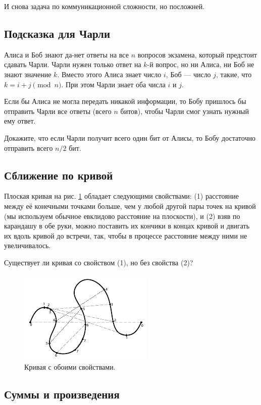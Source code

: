 \medskip

И снова задача по коммуникационной сложности, но посложней.

\subsection*{Подсказка для Чарли}

Алиса и Боб знают да-нет ответы на все $n$ вопросов экзамена, который предстоит сдавать Чарли.
Чарли нужен только ответ на $k$-й вопрос, но ни Алиса, ни Боб не знают значение $k$.
Вместо этого Алиса знает число $i$, Боб --- число $j$, такие, что $k = i + j \pmod n$.
При этом Чарли знает оба числа $i$ и $j$.

Если бы Алиса не могла передать никакой информации,
то Бобу пришлось бы отправить Чарли все ответы (всего $n$ битов), чтобы Чарли смог узнать нужный ему ответ.

Докажите, что если Чарли получит всего один бит от Алисы, то Бобу достаточно отправить всего $n/2$ бит.

\subsection*{Сближение по кривой}

Плоская кривая на рис. \ref{pic:s-curv} обладает следующими свойствами:
(1) расстояние между её конечными точками больше, чем у любой другой пары точек на кривой (мы используем обычное евклидово расстояние на плоскости),
и
(2) взяв по карандашу в обе руки, можно поставить их кончики в концах кривой и двигать их вдоль кривой до встречи, так, чтобы в процессе расстояние между ними не увеличивалось.

Существует ли кривая со свойством (1), но без свойства (2)?

\begin{figure}[htb!]
\centering
\includegraphics[scale=1]{pics/s-curve}
\caption{Кривая с обоими свойствами.}
\label{pic:s-curv}
\end{figure}

\subsection*{Суммы и произведения}

